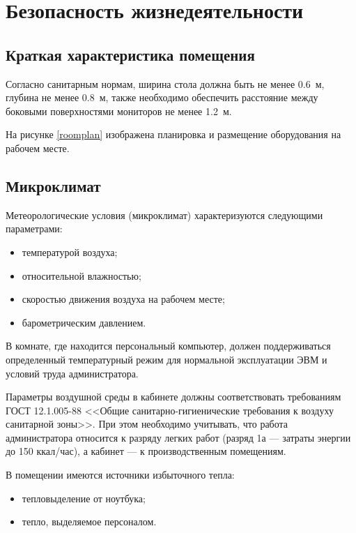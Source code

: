 \section{Безопасность жизнедеятельности}

\subsection{Краткая характеристика помещения}

Согласно санитарным нормам, ширина стола должна быть не менее 0.6~м, глубина не менее 0.8~м, также необходимо обеспечить расстояние между боковыми поверхностями мониторов не менее 1.2~м.

На рисунке \ref{roomplan} изображена планировка и размещение оборудования на рабочем месте.

\subsection{Микроклимат}

Метеорологические условия (микроклимат) характеризуются следующими параметрами:
\begin{itemize}
  \item температурой воздуха;
  \item относительной влажностью;
  \item скоростью движения воздуха на рабочем месте;
  \item барометрическим давлением.
\end{itemize}

В комнате, где находится персональный компьютер, должен поддерживаться определенный температурный режим для нормальной эксплуатации ЭВМ и условий труда администратора.

Параметры воздушной среды в кабинете должны соответствовать требованиям ГОСТ 12.1.005-88 <<Общие санитарно-гигиенические требования к воздуху санитарной зоны>>.
При этом необходимо учитывать, что работа администратора относится к разряду легких работ (разряд 1а --- затраты энергии до 150 ккал/час), а кабинет --- к производственным помещениям.

В помещении имеются источники избыточного тепла:
\begin{itemize}
  \item тепловыделение от ноутбука;
  \item тепло, выделяемое персоналом.
\end{itemize}

